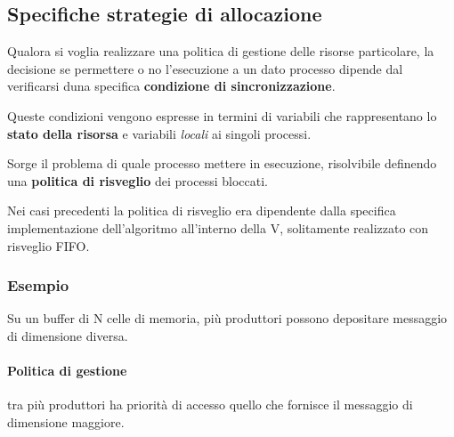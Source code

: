 \subsection{Specifiche strategie di allocazione}
Qualora si voglia realizzare una politica di gestione delle risorse particolare, la decisione se permettere o no l'esecuzione a un dato processo dipende dal verificarsi duna specifica \textbf{condizione di sincronizzazione}.

Queste condizioni vengono espresse in termini di variabili che rappresentano lo \textbf{stato della risorsa} e variabili \textit{locali} ai singoli processi.

Sorge il problema di quale processo mettere in esecuzione, risolvibile definendo una \textbf{politica di risveglio} dei processi bloccati.

Nei casi precedenti la politica di risveglio era dipendente dalla specifica implementazione dell'algoritmo all'interno della V, solitamente realizzato con risveglio FIFO.

\subsubsection{Esempio}
Su un buffer di N celle di memoria, più produttori possono depositare messaggio di dimensione diversa.

\paragraph{Politica di gestione} tra più produttori ha priorità di accesso quello che fornisce il messaggio di dimensione maggiore.





































































